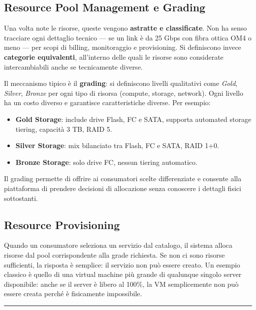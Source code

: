 \documentclass[
  italian,
  openany]{book}
\providecommand{\tightlist}{%
  \setlength{\itemsep}{0pt}\setlength{\parskip}{0pt}}
\begin{document}
\subsection{Resource Pool Management e
Grading}\label{resource-pool-management-e-grading}

Una volta note le risorse, queste vengono \textbf{astratte e
classificate}. Non ha senso tracciare ogni dettaglio tecnico --- se un
link è da 25 Gbps con fibra ottica OM4 o meno --- per scopi di billing,
monitoraggio e provisioning. Si definiscono invece \textbf{categorie
equivalenti}, all'interno delle quali le risorse sono considerate
intercambiabili anche se tecnicamente diverse.

Il meccanismo tipico è il \textbf{grading}: si definiscono livelli
qualitativi come \emph{Gold}, \emph{Silver}, \emph{Bronze} per ogni tipo
di risorsa (compute, storage, network). Ogni livello ha un costo diverso
e garantisce caratteristiche diverse. Per esempio:

\begin{itemize}
\tightlist
\item
  \textbf{Gold Storage}: include drive Flash, FC e SATA, supporta
  automated storage tiering, capacità 3 TB, RAID 5.
\item
  \textbf{Silver Storage}: mix bilanciato tra Flash, FC e SATA, RAID
  1+0.
\item
  \textbf{Bronze Storage}: solo drive FC, nessun tiering automatico.
\end{itemize}

Il grading permette di offrire ai consumatori scelte differenziate e
consente alla piattaforma di prendere decisioni di allocazione senza
conoscere i dettagli fisici sottostanti.

\subsection{Resource Provisioning}\label{resource-provisioning}

Quando un consumatore seleziona un servizio dal catalogo, il sistema
alloca risorse dal pool corrispondente alla grade richiesta. Se non ci
sono risorse sufficienti, la risposta è semplice: il servizio non può
essere creato. Un esempio classico è quello di una virtual machine più
grande di qualunque singolo server disponibile: anche se il server è
libero al 100\%, la VM semplicemente non può essere creata perché è
fisicamente impossibile.

\begin{center}\rule{0.5\linewidth}{0.5pt}\end{center}
\end{document}
